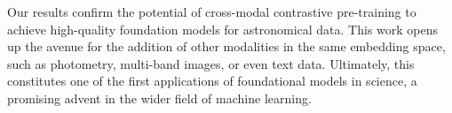 \documentclass[a4paper,12pt]{article}
\begin{document}
Our results confirm the potential of cross-modal contrastive pre-training to achieve high-quality foundation models for astronomical data. This work opens up the avenue for the addition of other modalities in the same embedding space, such as photometry, multi-band images, or even text data. Ultimately, this constitutes one of the first applications of foundational models in science, a promising advent in the wider field of machine learning.





\newpage


\end{document}
